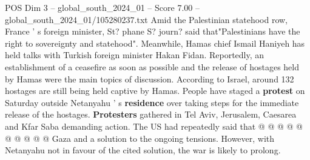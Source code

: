 \begin{textsample}{POS Dim 3 – global\_south\_2024\_01 – Score 7.00 – global\_south\_2024\_01/105280237.txt}
Amid the Palestinian statehood row, France ' s foreign minister, St? phane S? journ? said that"Palestinians have the right to sovereignty and statehood".
Meanwhile, Hamas chief Ismail Haniyeh has held talks with Turkish foreign minister Hakan Fidan.
Reportedly, an establishment of a ceasefire as soon as possible and the release of hostages held by Hamas were the main topics of discussion.
According to Israel, around 132 hostages are still being held captive by Hamas.
People have staged a \textbf{protest} on Saturday outside Netanyahu ' s \textbf{residence} over taking steps for the immediate release of the hostages. \textbf{Protesters} gathered in Tel Aviv, Jerusalem, Caesarea and Kfar Saba demanding action.
The US had repeatedly said that @ @ @ @ @ @ @ @ @ @ Gaza and a solution to the ongoing tensions.
However, with Netanyahu not in favour of the cited solution, the war is likely to prolong.

\end{textsample}
